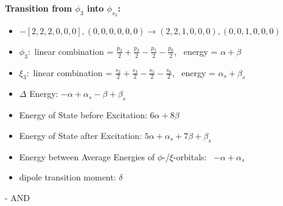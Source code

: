 \documentclass[12pt,a4paper]{article}
\begin{document}
        \noindent\textbf{Transition from $\phi_{3}$ into $\phi_{s_{3}}$:}
        \begin{itemize}
            \item $- [2, 2, 2, 0, 0, 0], (0, 0, 0, 0, 0, 0) \rightarrow (2, 2, 1, 0, 0, 0), (0, 0, 1, 0, 0, 0)$
        
            \item $\phi_{3}:$ linear combination = $\frac{p_{2}}{2} + \frac{p_{3}}{2} - \frac{p_{5}}{2} - \frac{p_{6}}{2}$, \
            energy = $\alpha + \beta$
            
            \item $\xi_{3}:$ linear combination = $\frac{s_{2}}{2} + \frac{s_{3}}{2} - \frac{s_{5}}{2} - \frac{s_{6}}{2}$, \
            energy = $\alpha_{s} + \beta_{s}$
            
            \item $\Delta$ Energy: $- \alpha + \alpha_{s} - \beta + \beta_{s}$
            \item Energy of State before Excitation: $6 \alpha + 8 \beta$
            \item Energy of State after Excitation: $5 \alpha + \alpha_{s} + 7 \beta + \beta_{s}$
            \item Energy between Average Energies of $\phi$-/$\xi$-orbitals: \
            $- \alpha + \alpha_{s}$
        
            \item dipole transition moment: $\delta$
        
        \end{itemize}
        
 -  AND 
\end{document}

